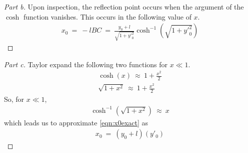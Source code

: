 \documentclass{article}
\numberwithin{equation}{section}
\begin{document}
\begin{proof}[Part b]
    Upon inspection, the reflection point occurs when the argument 
    of the $\cosh$ function vanishes. This occurs in the following 
    value of $x$. 
    \begin{align}\label{eqn:x0exact}
        \boxed{
        x_0 \ = \ -lBC \ = \  
            \frac{y_0 + l }{\sqrt{1 + {y'}_0^2}}\cosh^{-1}\left(\sqrt{1 + {y'}_0^2}\right)
        }
    \end{align}
\end{proof}

\begin{proof}[Part c]
    Taylor expand the following two functions for $x \ll 1$. 
    \begin{align}
        \cosh(x) \ \approx \ 1 + \frac {x^2} 2 \\ 
        \sqrt{1 + x^2} \ \approx \ 1 + \frac {x^2} 2
    \end{align}
    So, for $x \ll 1$, 
    \begin{align}
        \cosh^{-1}\left(\sqrt{1 + x^2}\right) \ \approx \ x 
    \end{align}
    which leads us to approximate \eqref{eqn:x0exact} as 
    \begin{align}
        \boxed{
        x_0 \ = \ (y_0 + l) (y'_0)}
    \end{align}

    
    
\end{proof}
\end{document}
